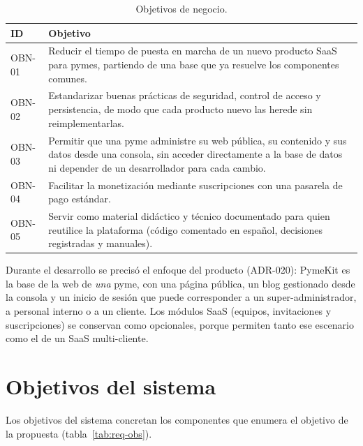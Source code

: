 \begin{table}[htbp]
  \centering
  \footnotesize
  \caption{Objetivos de negocio.}
  \label{tab:req-obn}
  \begin{tabularx}{\textwidth}{@{}lX@{}}
    \toprule
    \textbf{ID} & \textbf{Objetivo} \\
    \midrule
    OBN-01 & Reducir el tiempo de puesta en marcha de un nuevo producto SaaS para pymes, partiendo de una base que ya resuelve los componentes comunes. \\
    OBN-02 & Estandarizar buenas prácticas de seguridad, control de acceso y persistencia, de modo que cada producto nuevo las herede sin reimplementarlas. \\
    OBN-03 & Permitir que una pyme administre su web pública, su contenido y sus datos desde una consola, sin acceder directamente a la base de datos ni depender de un desarrollador para cada cambio. \\
    OBN-04 & Facilitar la monetización mediante suscripciones con una pasarela de pago estándar. \\
    OBN-05 & Servir como material didáctico y técnico documentado para quien reutilice la plataforma (código comentado en español, decisiones registradas y manuales). \\
    \bottomrule
  \end{tabularx}
\end{table}

Durante el desarrollo se precisó el enfoque del producto (ADR-020): PymeKit es
la base de la web de \emph{una} pyme, con una página pública, un blog
gestionado desde la consola y un inicio de sesión que puede corresponder a un
super-administrador, a personal interno o a un cliente. Los módulos SaaS
(equipos, invitaciones y suscripciones) se conservan como opcionales, porque
permiten tanto ese escenario como el de un SaaS multi-cliente.

\section{Objetivos del sistema}
\label{sec:req-objetivos-sistema}

Los objetivos del sistema concretan los componentes que enumera el objetivo de
la propuesta (tabla~\ref{tab:req-obs}).

